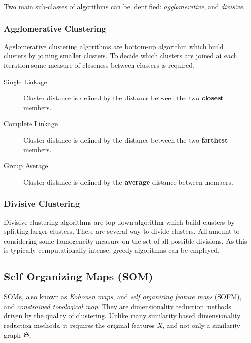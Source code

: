 Two main sub-classes of algorithms can be identified: \emph{agglomerative}, and \emph{divisive}.
\subsubsection{Agglomerative Clustering}
Agglomerative clustering algorithms are bottom-up algorithm which build clusters by joining smaller clusters. 
To decide which clusters are joined at each iteration some measure of closeness between clusters is required. 
\begin{description}
\item[Single Linkage] Cluster distance is defined by the distance between the two \textbf{closest} members.
\item[Complete Linkage] Cluster distance is defined by the distance between the two \textbf{farthest} members.
\item[Group Average] Cluster distance is defined by the \textbf{average} distance between members.
\end{description}


\subsubsection{Divisive Clustering}
Divisive clustering algorithms are top-down algorithm which build clusters by splitting larger clusters. 
There are several way to divide clusters. All amount to considering some homogeneity measure on the set of all possible divisions. As this is typically computationally intense, greedy algorithms can be employed.












\subsection{Self Organizing Maps (SOM)}
\label{sec:som}



SOMs, also known as \emph{Kohonen maps}, and \emph{self organizing feature maps} (SOFM), and \emph{constrained topological map}. 
They are dimensionality reduction methods driven by the quality of clustering.
Unlike many similarity based dimensionality reduction methods, it requires the original features $X$, and not only a similarity graph $\mathfrak{S}$. 


